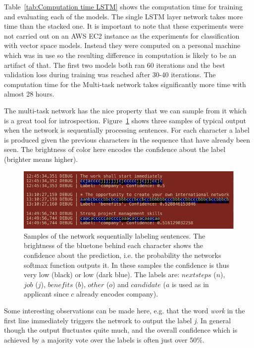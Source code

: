 Table~\ref{tab:Computation time LSTM} shows the computation time for training and evaluating each of the models. The single LSTM layer network takes more time than the stacked one. It is important to note that these experiments were not carried out on an \gls{AWS} EC2 instance as the experiments for classification with vector space models. Instead they were computed on a personal machine which was in use so the resulting difference in computation is likely to be an artifact of that. The first two models both ran 60 iterations and the best validation loss during training was reached after 30-40 iterations. The computation time for the Multi-task network takes significantly more time with almost 28 hours.

The multi-task network has the nice property that we can sample from it which is a great tool for introspection. Figure~\ref{fig:LSTM multi labeling output} shows three samples of typical output when the network is sequentially processing sentences. For each character a label is produced given the previous characters in the sequence that have already been seen. The brightness of color here encodes the confidence about the label (brighter means higher).

\begin{figure}[h]
    \centering
    \includegraphics[width=\textwidth]{img/LSTM-labeling-output.pdf}
    \caption{Samples of the network sequentially labeling sentences. The brightness of the bluetone behind each character shows the confidence about the prediction, i.e. the probability the networks softmax function outputs it. In these samples the confidence is thus very low (black) or low (dark blue). The labels are: $nextsteps$ ($n$), $job$ ($j$), $benefits$ ($b$), $other$ ($o$) and $candidate$ ($a$ is used as in applicant since $c$ already encodes company).}
\label{fig:LSTM multi labeling output}
\end{figure}

Some interesting observations can be made here, e.g. that the word \emph{work} in the first line immediately triggers the network to output the label \emph{j}. In general though the output fluctuates quite much, and the overall confidence which is achieved by a majority vote over the labels is often just over 50\%.

